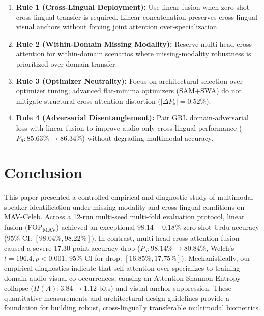 \documentclass[conference]{IEEEtran}
\newcommand{\fopmav}{FOP\textsubscript{MAV}}
\begin{document}
\begin{enumerate}
\item \textbf{Rule 1 (Cross-Lingual Deployment):} Use linear fusion when zero-shot cross-lingual transfer is required. Linear concatenation preserves cross-lingual visual anchors without forcing joint attention over-specialization.
\item \textbf{Rule 2 (Within-Domain Missing Modality):} Reserve multi-head cross-attention for within-domain scenarios where missing-modality robustness is prioritized over domain transfer.
\item \textbf{Rule 3 (Optimizer Neutrality):} Focus on architectural selection over optimizer tuning; advanced flat-minima optimizers (SAM+SWA) do not mitigate structural cross-attention distortion ($\overline{|\Delta P_5|} = 0.52\%$).
\item \textbf{Rule 4 (Adversarial Disentanglement):} Pair GRL domain-adversarial loss with linear fusion to improve audio-only cross-lingual performance ($P_6: 85.63\% \to 86.34\%$) without degrading multimodal accuracy.
\end{enumerate}

\section{Conclusion}
\label{sec:conclusion}

This paper presented a controlled empirical and diagnostic study of multimodal speaker identification under missing-modality and cross-lingual conditions on MAV-Celeb.
Across a 12-run multi-seed multi-fold evaluation protocol, linear fusion (\fopmav{}) achieved an exceptional $98.14 \pm 0.18\%$ zero-shot Urdu accuracy ($95\%$ CI: $[98.04\%, 98.22\%]$).
In contrast, multi-head cross-attention fusion caused a severe 17.30-point accuracy drop ($P_5: 98.14\% \to 80.84\%$, Welch's $t = 196.4, p < 0.001$, 95\% CI for drop: $[16.85\%, 17.75\%]$).
Mechanistically, our empirical diagnostics indicate that self-attention over-specializes to training-domain audio-visual co-occurrences, causing an Attention Shannon Entropy collapse ($H(A): 3.84 \to 1.12$ bits) and visual anchor suppression.
These quantitative measurements and architectural design guidelines provide a foundation for building robust, cross-lingually transferable multimodal biometrics.
\end{document}
